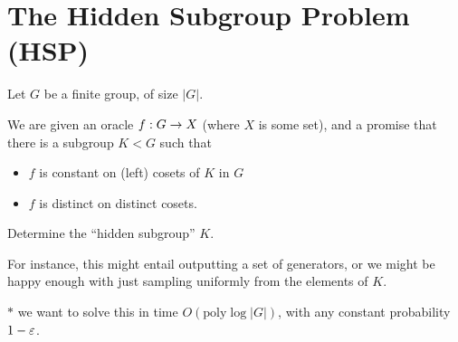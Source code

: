 \documentclass[]{article}
\newcommand{\poly}{\textrm{poly}}
\begin{document}
\section{The Hidden Subgroup Problem (HSP)}

Let $G$ be a finite group, of size $|G|$.

We are given an oracle $f : G\rightarrow X$ (where $X$ is some set), and a promise that there is a subgroup $K < G$ such that
\begin{itemize}
	\item $f$ is constant on (left) cosets of $K$ in $G$
	\item $f$ is distinct on distinct cosets.
\end{itemize}
\begin{remark*}[Problem]
Determine the ``hidden subgroup'' $K$.

For instance, this might entail outputting a set of generators, or we might be happy enough with just sampling uniformly from the elements of $K$.

$\ast$ we want to solve this in time $O(\poly\log|G|)$, with any constant probability $1 - \varepsilon$.
\end{remark*}
\end{document}
